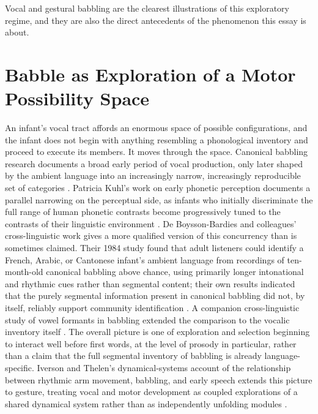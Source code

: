 \documentclass[11pt]{article}
\begin{document}
Vocal and gestural babbling are the clearest illustrations of this exploratory regime, and they are also the direct antecedents of the phenomenon this essay is about.

\section{Babble as Exploration of a Motor Possibility Space}

An infant's vocal tract affords an enormous space of possible configurations, and the infant does not begin with anything resembling a phonological inventory and proceed to execute its members. It moves through the space. Canonical babbling research documents a broad early period of vocal production, only later shaped by the ambient language into an increasingly narrow, increasingly reproducible set of categories \citep{oller2000}. Patricia Kuhl's work on early phonetic perception documents a parallel narrowing on the perceptual side, as infants who initially discriminate the full range of human phonetic contrasts become progressively tuned to the contrasts of their linguistic environment \citep{kuhl2004}. De Boysson-Bardies and colleagues' cross-linguistic work gives a more qualified version of this concurrency than is sometimes claimed. Their 1984 study found that adult listeners could identify a French, Arabic, or Cantonese infant's ambient language from recordings of ten-month-old canonical babbling above chance, using primarily longer intonational and rhythmic cues rather than segmental content; their own results indicated that the purely segmental information present in canonical babbling did not, by itself, reliably support community identification \citep{deboysson1984}. A companion cross-linguistic study of vowel formants in babbling extended the comparison to the vocalic inventory itself \citep{deboysson1989}. The overall picture is one of exploration and selection beginning to interact well before first words, at the level of prosody in particular, rather than a claim that the full segmental inventory of babbling is already language-specific. Iverson and Thelen's dynamical-systems account of the relationship between rhythmic arm movement, babbling, and early speech extends this picture to gesture, treating vocal and motor development as coupled explorations of a shared dynamical system rather than as independently unfolding modules \citep{iverson1999}.
\end{document}
